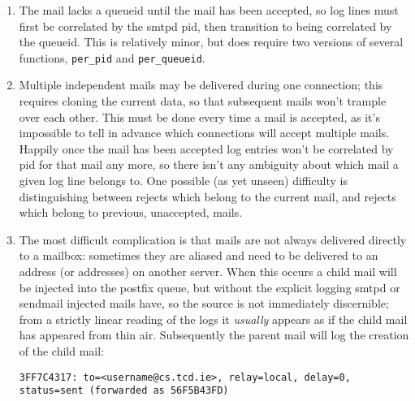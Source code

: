\documentclass[a4paper,12pt,draft]{article}
\begin{document}
\begin{enumerate}

    \item The mail lacks a queueid until the mail has been accepted, so log
        lines must first be correlated by the smtpd pid, then transition to
        being correlated by the queueid.  This is relatively minor, but
        does require two versions of several functions,
        \texttt{per\_pid} and \texttt{per\_queueid}.

    \item Multiple independent mails may be delivered during one
        connection; this requires cloning the current data, so that
        subsequent mails won't trample over each other.  This must be done
        every time a mail is accepted, as it's impossible to tell in
        advance which connections will accept multiple mails.  Happily once
        the mail has been accepted log entries won't be correlated by pid
        for that mail any more, so there isn't any ambiguity about which
        mail a given log line belongs to.  One possible (as yet unseen)
        difficulty is distinguishing between rejects which belong to the
        current mail, and rejects which belong to previous, unaccepted,
        mails.

    \item The most difficult complication is that mails are not always
        delivered directly to a mailbox: sometimes they are aliased and
        need to be delivered to an address (or addresses) on another
        server.  When this occurs a child mail will be injected into the
        postfix queue, but without the explicit logging smtpd or sendmail
        injected mails have, so the source is not immediately discernible;
        from a strictly linear reading of the logs it \textit{usually}
        appears as if the child mail has appeared from thin air.
        Subsequently the parent mail will log the creation of the child
        mail:

        \texttt{3FF7C4317: to=<username@cs.tcd.ie>, relay=local, \newline 
        delay=0, status=sent (forwarded as 56F5B43FD)}


\end{enumerate}
\end{document}
